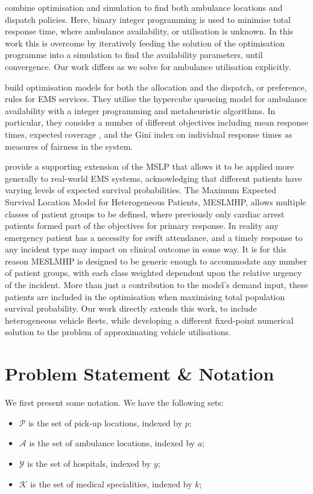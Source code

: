\documentclass[numbers,webpdf,imaman]{ima-authoring-template}%
\begin{document}
\citet{belanger20} combine optimisation and simulation to find
both ambulance locations and dispatch policies. Here, binary integer programming 
is used to minimise total response time, where ambulance availability, or
utilisation is unknown. In this work this is overcome by iteratively feeding the
solution of the optimisation programme into a simulation to find the
availability parameters, until convergence. Our work differs as we solve for
ambulance utilisation explicitly.

\citet{torodiaz13, torodiaz15} build
optimisation models for both the allocation and the dispatch, or preference,
rules for EMS services. They utilise the hypercube queueing model for ambulance
availability with a integer programming and metaheuristic algorithms. In
particular, they consider a number of different objectives including mean
response times, expected coverage \citep{daskin83}, and the Gini index on
individual response times as measures of fairness in the system.

\citet{Knight2012918} provide a supporting extension
of the MSLP that allows it to be applied more generally to real-world EMS
systems, acknowledging that different patients have varying levels of expected
survival probabilities.  The Maximum Expected Survival Location Model for
Heterogeneous Patients, MESLMHP, allows multiple classes of patient groups to
be defined, where previously only cardiac arrest patients formed part of the
objectives for primary response. In reality any emergency
patient has a necessity for swift attendance, and a timely response to any
incident type may impact on clinical outcome in some way. It is for this
reason MESLMHP is designed to be generic enough to accommodate any number of
patient groups, with each class weighted dependent upon the relative urgency
of the incident.  More than just a contribution to the model’s demand input,
these patients are included in the optimisation when maximising total
population survival probability.
Our work directly extends this work, to include heterogeneous vehicle fleets,
while developing a different fixed-point numerical solution to the problem of
approximating vehicle utilisations.


\section{Problem Statement \& Notation}\label{sec:problem_description}
We first present some notation. We have the following sets:

\begin{itemize}
  \item $\mathcal{P}$ is the set of pick-up locations, indexed by $p$;
  \item $\mathcal{A}$ is the set of ambulance locations, indexed by $a$;
  \item $\mathcal{Y}$ is the set of hospitals, indexed by $y$;
  \item $\mathcal{K}$ is the set of medical specialities, indexed by $k$;
\end{itemize}
\end{document}
